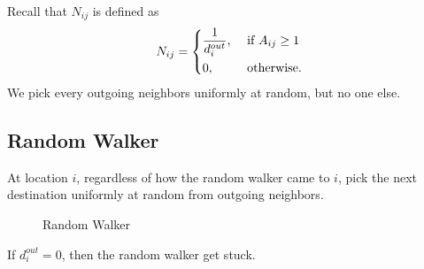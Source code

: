Recall that \(N_{ij}\) is defined as
\[
	N_{ij} = \begin{dcases}
		\frac{1}{d_i^{out}}, & \text{ if }A_{ij}\geq 1 \\
		0,                   & \text{ otherwise}.
	\end{dcases}
\]
We pick every outgoing neighbors uniformly at random, but no one else.

\subsection{Random Walker}
\begin{intuition}
	At location \(i\), regardless of how the random walker came to \(i\), pick the next destination uniformly at random from outgoing neighbors.
\end{intuition}

\begin{figure}[H]
	\centering
	\caption{Random Walker}
	\label{fig:random-walker}
\end{figure}

\begin{note}
	If \(d_i^{out} = 0\), then the random walker get stuck.
\end{note}